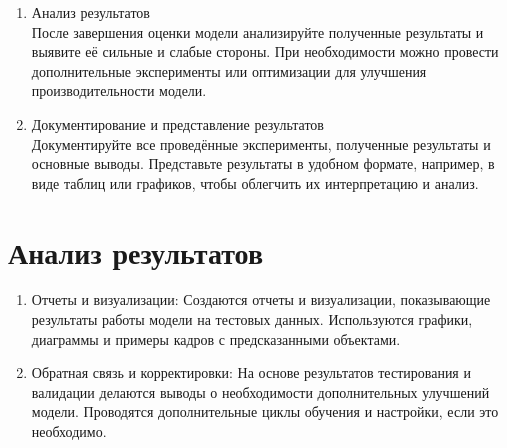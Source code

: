 \begin{enumerate}
        \item Анализ результатов \\
        После завершения оценки модели анализируйте полученные результаты и выявите её сильные и слабые стороны. При необходимости можно провести дополнительные эксперименты или оптимизации для улучшения производительности модели.
        
        \item Документирование и представление результатов \\
        Документируйте все проведённые эксперименты, полученные результаты и основные выводы. Представьте результаты в удобном формате, например, в виде таблиц или графиков, чтобы облегчить их интерпретацию и анализ.
    \end{enumerate}
 
    \section{Анализ результатов}
    \begin{enumerate}
        \item Отчеты и визуализации: Создаются отчеты и визуализации, показывающие результаты работы модели на тестовых данных. Используются графики, диаграммы и примеры кадров с предсказанными объектами.
        \item Обратная связь и корректировки: На основе результатов тестирования и валидации делаются выводы о необходимости дополнительных улучшений модели. Проводятся дополнительные циклы обучения и настройки, если это необходимо.
    \end{enumerate}
    
\endinput